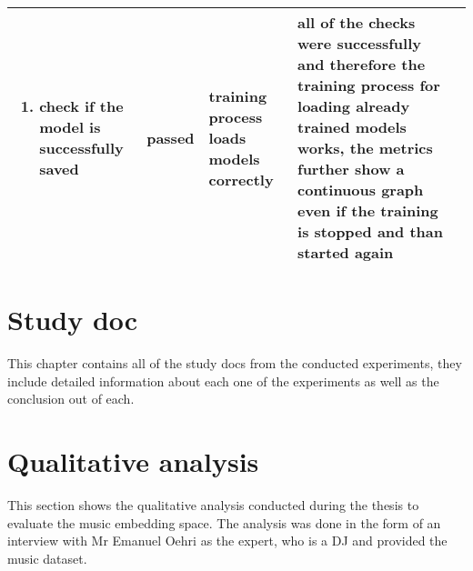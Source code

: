 \begin{longtable}{p{} | p{} | p{} | p{} | p{}}
\begin{minipage}{3.8in}
\begin{enumerate}
        \item check if the model is successfully saved
        \end{enumerate}
        \vskip 4pt
        \end{minipage} & \cellcolor{green!30!white}passed & training process loads models correctly & all of the checks were successfully and therefore the training process for loading already trained models works, the metrics further show a continuous graph even if the training is stopped and than started again \\
    \bottomrule
\end{longtable}

\clearpage
{}

\section{Study doc}
\label{app:Study-Doc}
This chapter contains all of the study docs from the conducted experiments, they include detailed information about each one of the experiments as well as the conclusion out of each.











\section{Qualitative analysis}
\label{app:Qualitative-analysis}
This section shows the qualitative analysis conducted during the thesis to evaluate the music embedding space. The analysis was done in the form of an interview with Mr Emanuel Oehri as the expert, who is a DJ and provided the music dataset.






